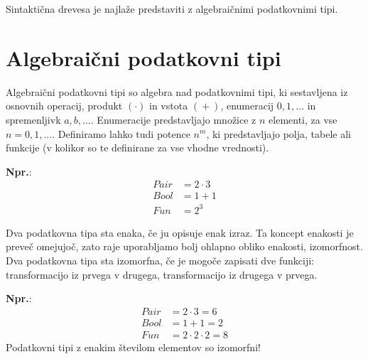 \documentclass{report}
\newcommand{\Ex}{\textbf{Npr.}:\ }
\newcommand{\Seq}{\cdot}
\newcommand{\Sum}{\mathrel{+}}
\newcommand{\Var}[1]{{#1}}
\begin{document}
Sintaktična drevesa je najlaže predstaviti z algebraičnimi podatkovnimi tipi.

\section{Algebraični podatkovni tipi} 
Algebraični podatkovni tipi so algebra nad podatkovnimi tipi, ki sestavljena iz osnovnih operacij, produkt $(\Seq)$ in vstota $(\Sum)$, enumeracij $0, 1, \dots$ in spremenljivk $\Var{a}, \Var{b}, \dots$. Enumeracije predstavljajo množice z $n$ elementi, za vse $n = 0, 1, \dots$.
Definiramo lahko tudi potence $n^m$, ki predstavljajo polja, tabele ali funkcije (v kolikor so te definirane za vse vhodne vrednosti).

\Ex
\begin{equation*}
  \begin{aligned}
    Pair &= 2 \Seq 3\\
    Bool &= 1 \Sum 1\\
    Fun &= 2 ^ 3
  \end{aligned}
\end{equation*}

Dva podatkovna tipa sta enaka, če ju opisuje enak izraz.
Ta koncept enakosti je preveč omejujoč, zato raje uporabljamo bolj ohlapno obliko enakosti, izomorfnost.
Dva podatkovna tipa sta izomorfna, če je mogoče zapisati dve funkciji: transformacijo iz prvega v drugega, transformacijo iz drugega v prvega.

\Ex
\begin{equation*}
  \begin{aligned}
    Pair &= 2 \Seq 3 = 6\\
    Bool &= 1 \Sum 1 = 2\\
    Fun &= 2 \Seq 2 \Seq 2 = 8
  \end{aligned}
\end{equation*}
Podatkovni tipi z enakim številom elementov so izomorfni!
\end{document}
